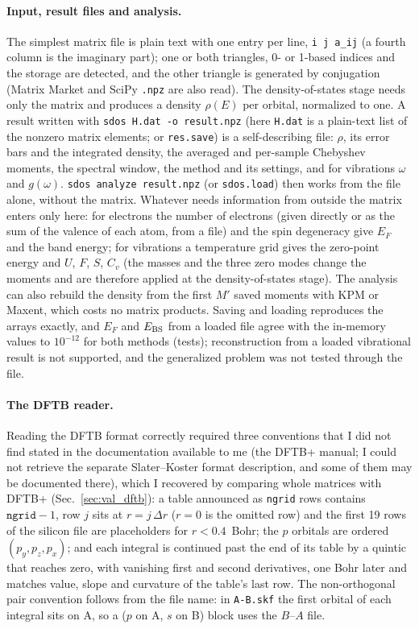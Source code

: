 \documentclass[reprint,nofootinbib,superscriptaddress,amsmath,amssymb,aps,prb,floatfix]{revtex4-2}
\begin{document}
\paragraph*{Input, result files and analysis.}
The simplest matrix file is plain text with one entry per line, \texttt{i j a\_ij} (a fourth column is the imaginary part); one or both triangles, 0- or 1-based indices and the storage are detected, and the other triangle is generated by conjugation (Matrix Market and SciPy \texttt{.npz} are also read).
The density-of-states stage needs only the matrix and produces a density $\rho(E)$ per orbital, normalized to one.
A result written with \texttt{sdos H.dat -o result.npz} (here \texttt{H.dat} is a plain-text list of the nonzero matrix elements; or \texttt{res.save}) is a self-describing file: $\rho$, its error bars and the integrated density, the averaged and per-sample Chebyshev moments, the spectral window, the method and its settings, and for vibrations $\omega$ and $g(\omega)$.
\texttt{sdos analyze result.npz} (or \texttt{sdos.load}) then works from the file alone, without the matrix.
Whatever needs information from outside the matrix enters only here: for electrons the number of electrons (given directly or as the sum of the valence of each atom, from a file) and the spin degeneracy give $E_F$ and the band energy; for vibrations a temperature grid gives the zero-point energy and $U$, $F$, $S$, $C_v$ (the masses and the three zero modes change the moments and are therefore applied at the density-of-states stage).
The analysis can also rebuild the density from the first $M'$ saved moments with KPM or Maxent, which costs no matrix products.
Saving and loading reproduces the arrays exactly, and $E_F$ and $E_{\rm BS}$ from a loaded file agree with the in-memory values to $10^{-12}$ for both methods (tests); reconstruction from a loaded vibrational result is not supported, and the generalized problem was not tested through the file.

\paragraph*{The DFTB reader.}
Reading the DFTB format correctly required three conventions that I did not find stated in the documentation available to me (the DFTB+ manual; I could not retrieve the separate Slater--Koster format description, and some of them may be documented there), which I recovered by comparing whole matrices with DFTB+ \cite{dftbplus} (Sec.~\ref{sec:val_dftb}): a table announced as \texttt{ngrid} rows contains $\texttt{ngrid}-1$, row $j$ sits at $r=j\,\Delta r$ ($r=0$ is the omitted row) and the first 19 rows of the silicon file are placeholders for $r<0.4$~Bohr; the $p$ orbitals are ordered $(p_y,p_z,p_x)$; and each integral is continued past the end of its table by a quintic that reaches zero, with vanishing first and second derivatives, one Bohr later and matches value, slope and curvature of the table's last row.
The non-orthogonal pair convention follows from the file name: in \texttt{A-B.skf} the first orbital of each integral sits on A, so a ($p$ on A, $s$ on B) block uses the $B$--$A$ file.
\end{document}
